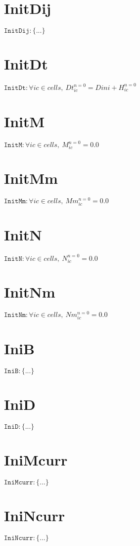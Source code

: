 \documentclass[11pt]{article}
\begin{document}
\section{InitDij}
$\texttt{InitDij} : \{ ... \}$


\section{InitDt}
$\texttt{InitDt} : \forall{ic\in cells}, \ Dt^{n=0}_{ic} = Dini + H^{n=0}_{ic}$


\section{InitM}
$\texttt{InitM} : \forall{ic\in cells}, \ M^{n=0}_{ic} = 0.0$


\section{InitMm}
$\texttt{InitMm} : \forall{ic\in cells}, \ Mm^{n=0}_{ic} = 0.0$


\section{InitN}
$\texttt{InitN} : \forall{ic\in cells}, \ N^{n=0}_{ic} = 0.0$


\section{InitNm}
$\texttt{InitNm} : \forall{ic\in cells}, \ Nm^{n=0}_{ic} = 0.0$


\section{IniB}
$\texttt{IniB} : \{ ... \}$


\section{IniD}
$\texttt{IniD} : \{ ... \}$


\section{IniMcurr}
$\texttt{IniMcurr} : \{ ... \}$


\section{IniNcurr}
$\texttt{IniNcurr} : \{ ... \}$
\end{document}
